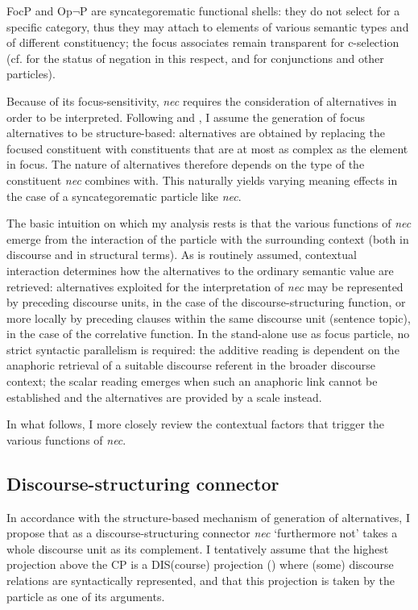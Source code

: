 \documentclass[output=paper,modfonts,nonflat,citecolor=brown,
showindex
]{langsci/langscibook}
\begin{document}
FocP and Op$\lnot$P are syncategorematic functional shells: they do not select for a specific category, thus they may attach to elements of various semantic types and of different constituency; the focus associates remain transparent for c-selection (cf. \citealt[120--126]{Cinque99} for the status of negation in this respect, and \citealt[199--203]{BHR14} for conjunctions and other particles).

Because of its focus-sensitivity, {\emph{nec}} requires the consideration of alternatives in order to be interpreted. Following \citet{Katzir07} and \citet{FoxKatzir11}, I assume the generation of focus alternatives to be structure-based: alternatives are obtained by replacing the focused constituent with constituents that are at most as complex as the element in focus. The nature of alternatives therefore depends on the type of the constituent {\emph{nec}} combines with. This naturally yields varying meaning effects in the case of a syncategorematic particle like {\emph{nec}}.

The basic intuition on which my analysis rests is that the various functions of {\emph{nec}} emerge from the interaction of the particle with the surrounding context (both in discourse and in structural terms). As is routinely assumed, contextual interaction determines how the alternatives to the ordinary semantic value are retrieved: alternatives exploited for the interpretation of {\emph{nec}} may be represented by preceding discourse units, in the case of the discourse-structuring function, or more locally by preceding clauses within the same discourse unit (sentence topic), in the case of the correlative function. In the stand-alone use as focus particle, no strict syntactic parallelism is required: the additive reading is dependent on the anaphoric retrieval of a suitable discourse referent in the broader discourse context; the scalar reading emerges when such an anaphoric link cannot be established and the alternatives are provided by a scale instead.

In what follows, I more closely review the contextual factors that trigger the various functions of {\emph{nec}}.

\subsection{Discourse-structuring connector} \label{analysisdiscuousestructuring}

In accordance with the structure-based mechanism of generation of alternatives, I propose that as a discourse-structuring connector {\emph{nec}} `furthermore not' takes a whole discourse unit as its complement. I tentatively assume that the highest projection above the CP is a DIS(course) projection (\citealt{Giorgi15}) where (some) discourse relations are syntactically represented, and that this projection is taken by the particle as one of its arguments.
\end{document}
